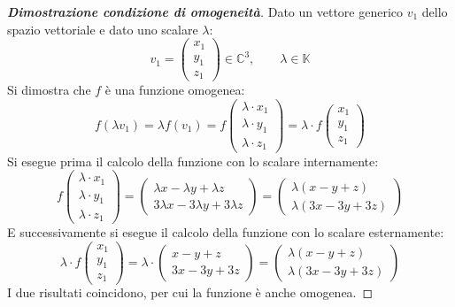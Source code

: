 \documentclass[a4paper]{article}
\begin{document}
	\begin{proof}[\textbf{Dimostrazione condizione di omogeneità}]
		Dato un vettore generico $v_{1}$ dello spazio vettoriale e dato uno scalare $\lambda$:
		\begin{equation*}
			v_{1} = \begin{pmatrix}
				x_{1} \\ y_{1} \\ z_{1}
			\end{pmatrix} \in \mathbb{C}^{3}, \hspace{2em} \lambda \in \mathbb{K}
		\end{equation*}
		Si dimostra che $f$ è una funzione omogenea:
		\begin{equation*}
			f\left(\lambda v_{1}\right) = \lambda f\left(v_{1}\right) =
			f\begin{pmatrix}
				\lambda \cdot x_{1} \\ \lambda \cdot y_{1} \\ \lambda \cdot z_{1}
			\end{pmatrix} = \lambda \cdot f\begin{pmatrix}
				x_{1} \\ y_{1} \\ z_{1}
			\end{pmatrix}
		\end{equation*}
		Si esegue prima il calcolo della funzione con lo scalare internamente:
		\begin{equation*}
			f\begin{pmatrix}
				\lambda \cdot x_{1} \\ \lambda \cdot y_{1} \\ \lambda \cdot z_{1}
			\end{pmatrix} =
			\begin{pmatrix}
				\lambda x - \lambda y + \lambda z \\
				3\lambda x - 3\lambda y + 3\lambda z
			\end{pmatrix} =
			\begin{pmatrix}
				\lambda \left(x - y + z\right) \\
				\lambda \left(3x - 3y + 3z\right)
			\end{pmatrix}
		\end{equation*}
		E successivamente si esegue il calcolo della funzione con lo scalare esternamente:
		\begin{equation*}
			\lambda \cdot f\begin{pmatrix}
				x_{1} \\ y_{1} \\ z_{1}
			\end{pmatrix} = \lambda \cdot
			\begin{pmatrix}
				x-y+z \\
				3x-3y+3z
			\end{pmatrix} =
			\begin{pmatrix}
				\lambda \left(x - y + z\right) \\
				\lambda \left(3x - 3y + 3z\right)
			\end{pmatrix}
		\end{equation*}
		I due risultati coincidono, per cui la funzione è anche omogenea.
	\end{proof}\:\newline
\end{document}
